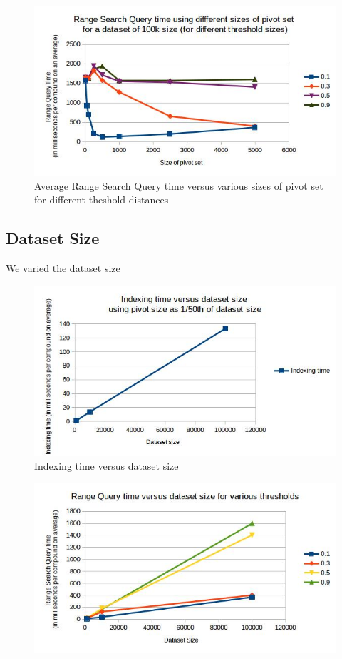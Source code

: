 \begin{figure}[ht!]	
\centering
\includegraphics[width=1 \columnwidth]{img/image5.jpg}
\caption{Average Range Search Query time versus various sizes of pivot set for different theshold distances}
\label{fig:5.7}
\end{figure}



\subsection{Dataset Size}
We varied the dataset size 


\begin{figure}[ht!]	
\centering
\includegraphics[width=1 \columnwidth]{img/image6.jpg}
\caption{Indexing time versus dataset size}
\label{fig:5.8}
\end{figure}


\begin{figure}[ht!]	
\centering
\includegraphics[width=1 \columnwidth]{img/image9.jpg}
\caption{}
\label{fig:5.8}
\end{figure}





